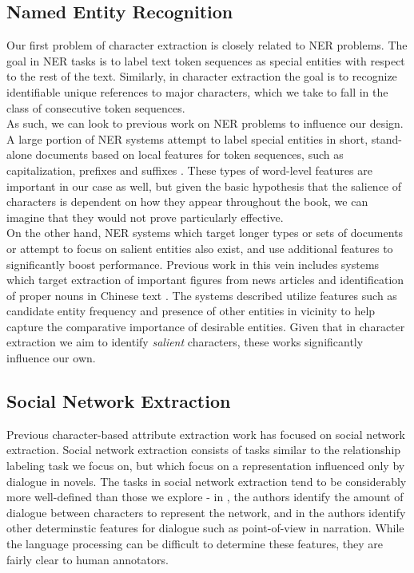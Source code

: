 \documentclass[12pt]{article}
\begin{document}
\subsection{Named Entity Recognition}

    Our first problem of character extraction is closely related to NER problems. The goal in NER tasks
    is to label text token sequences as special entities with respect to the rest of the text. Similarly, in 
    character extraction the goal is to recognize identifiable unique references to major characters, which
    we take to fall in the class of consecutive token sequences. \\

    As such, we can look to previous work on NER problems to influence our design. A large portion of NER systems
    attempt to label special entities in short, stand-alone documents based on local features for token
    sequences, such as capitalization, prefixes and suffixes \cite{nadeau2007survey}. These types of word-level
    features are important in our case as well, but given the basic hypothesis that the salience of characters 
    is dependent on how they appear throughout the book, we can imagine that they would not prove particularly 
    effective. \\

    On the other hand, NER systems which target longer types or sets of documents or attempt to focus on
    salient entities also exist, and use additional features to significantly boost performance. 
    Previous work in this vein includes systems which target extraction of important figures 
    from news articles \cite{zhang2004focused} and identification of proper nouns in Chinese text \cite{chen1996identification}.
    The systems described utilize features such as candidate entity frequency and presence of other
    entities in vicinity to help capture the comparative importance of desirable entities. Given that in 
    character extraction we aim to identify \emph{salient} characters, these works significantly influence
    our own. \\

\subsection{Social Network Extraction}

    Previous character-based attribute extraction work has focused on social network extraction.
    Social network extraction consists of tasks similar to the relationship labeling task we focus on, but which 
    focus on a representation influenced only by dialogue in novels. The tasks in social network
    extraction tend to be considerably more well-defined than those we explore - in \cite{elson2010extracting},
    the authors identify the amount of dialogue between characters to represent the network, and in
    \cite{agarwal2012social} the authors identify other determinstic features for dialogue such as
    point-of-view in narration. While the language processing can be difficult to determine these
    features, they are fairly clear to human annotators. \\
\end{document}
